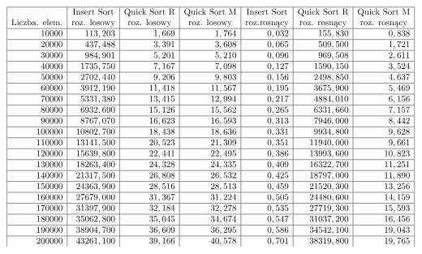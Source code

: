 \documentclass[polish,polish,a4paper]{article}
\begin{document}
\begin{spacing}{1.5}
\begin{figure}[H]
	\begin{equation*}
	\begin{array}{|r|r|r|r|r|r|r|}
	\hline	
	&\multicolumn{1}{c|}{$Insert Sort$}&\multicolumn{1}{c|}{$Quick Sort R$}&\multicolumn{1}{c|}{$Quick Sort M$}&\multicolumn{1}{c|}{$Insert Sort$}&\multicolumn{1}{c|}{$Quick Sort R$}&\multicolumn{1}{c|}{$Quick Sort M$}\\
	\multicolumn{1}{|c|}{$Liczba. elem.$}&\multicolumn{1}{c|}{$roz. losowy$}&\multicolumn{1}{c|}{$roz. losowy$}&\multicolumn{1}{c|}{$roz. losowy$}&\multicolumn{1}{c|}{$roz.rosnący$}&\multicolumn{1}{c|}{$roz. rosnący$}&\multicolumn{1}{c|}{$roz. rosnący$}\\\hline
	10000&	113,203&	1,669&	1,764&	0,032&	155,830&	0,838\\\hline
	20000&	437,488&	3,391&	3,608&	0,065&	509,500&	1,721\\\hline
	30000&	984,901&	5,201&	5,210&	0,096&	969,508&	2,611\\\hline
	40000&	1735,750&	7,167&	7,098&	0,127&	1590,150&	3,524\\\hline
	50000&	2702,440&	9,206&	9,803&	0,156&	2498,850&	4,637\\\hline
	60000&	3912,190&	11,418&	11,567&	0,195&	3675,900&	5,469\\\hline
	70000&	5331,380&	13,415&	12,994&	0,217&	4884,010&	6,156\\\hline
	80000&	6932,690&	15,126&	15,562&	0,265&	6331,660&	7,157\\\hline
	90000&	8767,070&	16,623&	16,593&	0,313&	7946,000&	8,442\\\hline
	100000&	10802,700&	18,438&	18,636&	0,331&	9934,800&	9,628\\\hline
	110000&	13141,500&	20,523&	21,309&	0,351&	11940,000&	9,661\\\hline
	120000&	15639,800&	22,441&	22,495&	0,386&	13993,600&	10,823\\\hline
	130000&	18263,400&	24,328&	24,335&	0,409&	16322,700&	11,251\\\hline
	140000&	21317,500&	26,808&	26,532&	0,425&	18797,000&	11,890\\\hline
	150000&	24363,900&	28,516&	28,513&	0,459&	21520,300&	13,256\\\hline
	160000&	27679,000&	31,367&	31,224&	0,505&	24480,600&	14,159\\\hline
	170000&	31397,900&	32,184&	32,278&	0,535&	27719,300&	15,593\\\hline
	180000&	35062,800&	35,045&	34,674&	0,547&	31037,200&	16,456\\\hline
	190000&	38904,700&	36,609&	36,295&	0,586&	34542,100&	19,043\\\hline
	200000&	43261,100&	39,166&	40,578&	0,701&	38319,800&	19,765\\
	

\end{array}
\end{equation*}
\end{figure}
\end{spacing}
\end{document}
